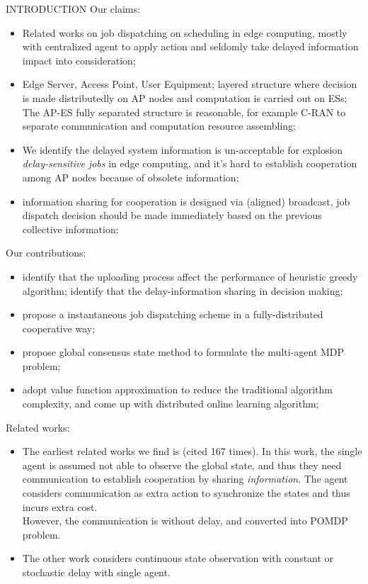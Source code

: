\documentclass[10pt, conference, letterpaper]{IEEEtran}
\begin{document}
    \begin{section}{INTRODUCTION}
        \label{sec:introduction}
        Our claims:
        \begin{itemize}
            \item Related works on job dispatching on scheduling in edge computing, mostly with centralized agent to apply action and seldomly take delayed information impact into consideration;
            \item Edge Server, Access Point, User Equipment; layered structure where decision is made distributedly on AP nodes and computation is carried out on ESs; The AP-ES fully separated structure is reasonable, for example C-RAN to separate communication and computation resource assembling;
            \item We identify the delayed system information is un-acceptable for explosion \emph{delay-sensitive jobs} in edge computing, and it's hard to establish cooperation among AP nodes because of obsolete information;
            \item information sharing for cooperation is designed via (aligned) broadcast, job dispatch decision should be made immediately based on the previous collective information;
        \end{itemize}

        Our contributions:
        \begin{itemize}
            \item identify that the uploading process affect the performance of heuristic greedy algorithm; identify that the delay-information sharing in decision making;
            \item propose a instantaneous job dispatching scheme in a fully-distributed cooperative way;
            \item propose global consensus state method to formulate the multi-agent MDP problem;
            \item adopt value function approximation to reduce the traditional algorithm complexity, and come up with distributed online learning algorithm;
        \end{itemize}

        Related works:
        \begin{itemize}
            \item The earliest related works we find is \cite{ref-01} (cited 167 times). In this work, the single agent is assumed not able to observe the global state, and thus they need communication to establish cooperation by sharing \emph{information}. The agent considers communication as extra action to synchronize the states and thus incurs extra cost. \\
            However, the communication is without delay, and converted into POMDP problem.
            \item The other work \cite{ref-02} considers continuous state observation with constant or stochastic delay with single agent.
        \end{itemize}


\end{section}
\end{document}
